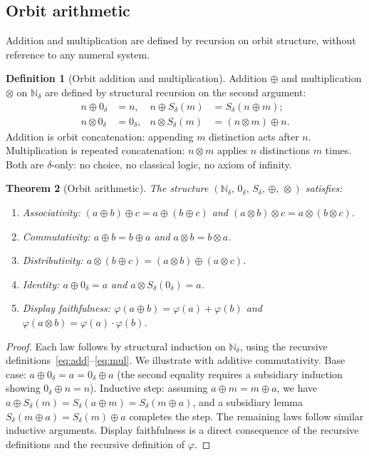 \documentclass[11pt,a4paper]{article}
\newtheorem{theorem}{Theorem}[section]
\theoremstyle{definition}
\newtheorem{definition}[theorem]{Definition}
\theoremstyle{remark}
\begin{document}
\subsection{Orbit arithmetic}

Addition and multiplication are defined by recursion on orbit structure,
without reference to any numeral system.

\begin{definition}[Orbit addition and multiplication]\label{def:orbitops}
Addition $\oplus$ and multiplication $\otimes$ on $\mathbb{N}_\delta$ are
defined by structural recursion on the second argument:
\begin{align}
  n \oplus 0_\delta &= n, &
  n \oplus S_\delta(m) &= S_\delta(n \oplus m); \label{eq:add} \\
  n \otimes 0_\delta &= 0_\delta, &
  n \otimes S_\delta(m) &= (n \otimes m) \oplus n. \label{eq:mul}
\end{align}
Addition is orbit concatenation: appending $m$ distinction acts after $n$.
Multiplication is repeated concatenation: $n \otimes m$ applies $n$
distinctions $m$ times. Both are $\delta$-only: no choice, no classical logic,
no axiom of infinity.
\end{definition}

\begin{theorem}[Orbit arithmetic]\label{thm:orbit}
The structure $(\mathbb{N}_\delta,\, 0_\delta,\, S_\delta,\, \oplus,\,
\otimes)$ satisfies:
\begin{enumerate}[leftmargin=2em, label=\textup{(\alph*)}]
  \item Associativity: $(a \oplus b) \oplus c = a \oplus (b \oplus c)$ and
    $(a \otimes b) \otimes c = a \otimes (b \otimes c)$.
  \item Commutativity: $a \oplus b = b \oplus a$ and
    $a \otimes b = b \otimes a$.
  \item Distributivity: $a \otimes (b \oplus c) =
    (a \otimes b) \oplus (a \otimes c)$.
  \item Identity: $a \oplus 0_\delta = a$ and
    $a \otimes S_\delta(0_\delta) = a$.
  \item Display faithfulness: $\varphi(a \oplus b) = \varphi(a) + \varphi(b)$
    and $\varphi(a \otimes b) = \varphi(a) \cdot \varphi(b)$.
\end{enumerate}
\end{theorem}

\begin{proof}
Each law follows by structural induction on $\mathbb{N}_\delta$, using the
recursive definitions~\eqref{eq:add}--\eqref{eq:mul}. We illustrate with
additive commutativity. Base case: $a \oplus 0_\delta = a = 0_\delta \oplus a$
(the second equality requires a subsidiary induction showing $0_\delta \oplus
n = n$). Inductive step: assuming $a \oplus m = m \oplus a$, we have
$a \oplus S_\delta(m) = S_\delta(a \oplus m) = S_\delta(m \oplus a)$, and a
subsidiary lemma $S_\delta(m \oplus a) = S_\delta(m) \oplus a$ completes the
step. The remaining laws follow similar inductive arguments. Display
faithfulness is a direct consequence of the recursive definitions and the
recursive definition of $\varphi$.
\end{proof}
\end{document}
